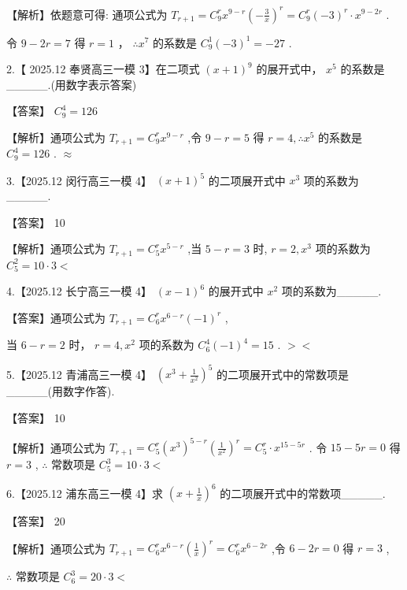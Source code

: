 \documentclass[10pt]{article}
\begin{document}
【解析】依题意可得: 通项公式为 \({T}_{r + 1} = {C}_{9}^{r}{x}^{9 - r}{\left( -\frac{3}{x}\right) }^{r} = {C}_{9}^{r}{\left( -3\right) }^{r} \cdot  {x}^{9 - {2r}}\) .

令 \(9 - {2r} = 7\) 得 \(r = 1\) ， \(\therefore {x}^{7}\) 的系数是 \({C}_{9}^{1}{\left( -3\right) }^{1} =  - {27}\) .

2.【 2025.12 奉贤高三一模 3】在二项式 \({\left( x + 1\right) }^{9}\) 的展开式中， \({x}^{5}\) 的系数是\_\_\_\_\_.(用数字表示答案)

【答案】 \({C}_{9}^{4} = {126}\)

【解析】通项公式为 \({T}_{r + 1} = {C}_{9}^{r}{x}^{9 - r}\) ,令 \(9 - r = 5\) 得 \(r = 4,\therefore {x}^{5}\) 的系数是 \({C}_{9}^{4} = {126}\) . \(\approx\)

3.【2025.12 闵行高三一模 4】 \({\left( x + 1\right) }^{5}\) 的二项展开式中 \({x}^{3}\) 项的系数为\_\_\_\_\_.

【答案】 10

【解析】通项公式为 \({T}_{r + 1} = {C}_{5}^{r}{x}^{5 - r}\) ,当 \(5 - r = 3\) 时, \(r = 2,{x}^{3}\) 项的系数为 \({C}_{5}^{2} = {10} \cdot  3 <\)

4.【2025.12 长宁高三一模 4】 \({\left( x - 1\right) }^{6}\) 的展开式中 \({x}^{2}\) 项的系数为\_\_\_\_\_.

【答案】通项公式为 \({T}_{r + 1} = {C}_{6}^{r}{x}^{6 - r}{\left( -1\right) }^{r}\) ,

当 \(6 - r = 2\) 时， \(r = 4,{x}^{2}\) 项的系数为 \({C}_{6}^{4}{\left( -1\right) }^{4} = {15}\) . \(>  <\)

5.【2025.12 青浦高三一模 4】 \({\left( {x}^{3} + \frac{1}{{x}^{2}}\right) }^{5}\) 的二项展开式中的常数项是\_\_\_\_\_(用数字作答).

【答案】 10

【解析】通项公式为 \({T}_{r + 1} = {C}_{5}^{r}{\left( {x}^{3}\right) }^{5 - r}{\left( \frac{1}{{x}^{2}}\right) }^{r} = {C}_{5}^{r} \cdot  {x}^{{15} - {5r}}\) . 令 \({15} - {5r} = 0\) 得 \(r = 3\) , \(\therefore\) 常数项是 \({C}_{5}^{3} = {10} \cdot  3 <\)

6.【2025.12 浦东高三一模 4】求 \({\left( x + \frac{1}{x}\right) }^{6}\) 的二项展开式中的常数项\_\_\_\_\_.

【答案】 20

【解析】通项公式为 \({T}_{r + 1} = {C}_{6}^{r}{x}^{6 - r}{\left( \frac{1}{x}\right) }^{r} = {C}_{6}^{r}{x}^{6 - {2r}}\) ,令 \(6 - {2r} = 0\) 得 \(r = 3\) ,

\(\therefore\) 常数项是 \({C}_{6}^{3} = {20} \cdot  3 <\)
\end{document}
